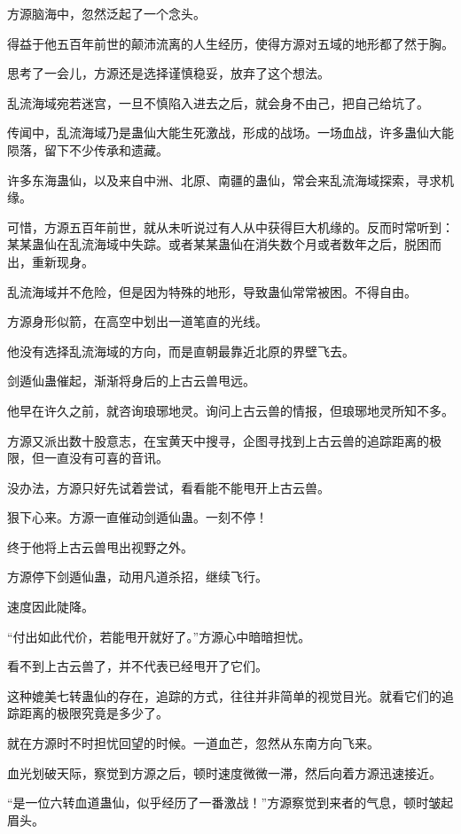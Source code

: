 \begin{this_body}
方源脑海中，忽然泛起了一个念头。

得益于他五百年前世的颠沛流离的人生经历，使得方源对五域的地形都了然于胸。

思考了一会儿，方源还是选择谨慎稳妥，放弃了这个想法。

乱流海域宛若迷宫，一旦不慎陷入进去之后，就会身不由己，把自己给坑了。

传闻中，乱流海域乃是蛊仙大能生死激战，形成的战场。一场血战，许多蛊仙大能陨落，留下不少传承和遗藏。

许多东海蛊仙，以及来自中洲、北原、南疆的蛊仙，常会来乱流海域探索，寻求机缘。

可惜，方源五百年前世，就从未听说过有人从中获得巨大机缘的。反而时常听到：某某蛊仙在乱流海域中失踪。或者某某蛊仙在消失数个月或者数年之后，脱困而出，重新现身。

乱流海域并不危险，但是因为特殊的地形，导致蛊仙常常被困。不得自由。

方源身形似箭，在高空中划出一道笔直的光线。

他没有选择乱流海域的方向，而是直朝最靠近北原的界壁飞去。

剑遁仙蛊催起，渐渐将身后的上古云兽甩远。

他早在许久之前，就咨询琅琊地灵。询问上古云兽的情报，但琅琊地灵所知不多。

方源又派出数十股意志，在宝黄天中搜寻，企图寻找到上古云兽的追踪距离的极限，但一直没有可喜的音讯。

没办法，方源只好先试着尝试，看看能不能甩开上古云兽。

狠下心来。方源一直催动剑遁仙蛊。一刻不停！

终于他将上古云兽甩出视野之外。

方源停下剑遁仙蛊，动用凡道杀招，继续飞行。

速度因此陡降。

“付出如此代价，若能甩开就好了。”方源心中暗暗担忧。

看不到上古云兽了，并不代表已经甩开了它们。

这种媲美七转蛊仙的存在，追踪的方式，往往并非简单的视觉目光。就看它们的追踪距离的极限究竟是多少了。

就在方源时不时担忧回望的时候。一道血芒，忽然从东南方向飞来。

血光划破天际，察觉到方源之后，顿时速度微微一滞，然后向着方源迅速接近。

“是一位六转血道蛊仙，似乎经历了一番激战！”方源察觉到来者的气息，顿时皱起眉头。


\end{this_body}
